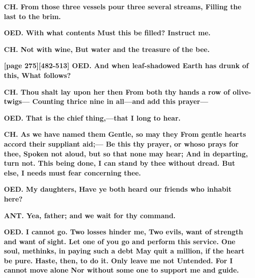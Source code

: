 \documentclass[11pt,letter]{book}
\begin{document}
\par \textbf{CH. From those three vessels pour three several streams, Filling the last to the brim.}
\par 

\par \textbf{OED. With what contents Must this be filled? Instruct me.}
\par 

\par \textbf{CH. Not with wine, But water and the treasure of the bee.}
\par 

\par \textbf{[page 275][482-513] OED. And when leaf-shadowed Earth has drunk of this, What follows?}
\par 

\par \textbf{CH. Thou shalt lay upon her then From both thy hands a row of olive-twigs— Counting thrice nine in all—and add this prayer—}
\par 

\par \textbf{OED. That is the chief thing,—that I long to hear.}
\par 

\par \textbf{CH. As we have named them Gentle, so may they From gentle hearts accord their suppliant aid;— Be this thy prayer, or whoso prays for thee, Spoken not aloud, but so that none may hear; And in departing, turn not. This being done, I can stand by thee without dread. But else, I needs must fear concerning thee.}
\par 

\par \textbf{OED. My daughters, Have ye both heard our friends who inhabit here?}
\par 

\par \textbf{ANT. Yea, father; and we wait for thy command.}
\par 

\par \textbf{OED. I cannot go. Two losses hinder me, Two evils, want of strength and want of sight. Let one of you go and perform this service. One soul, methinks, in paying such a debt May quit a million, if the heart be pure. Haste, then, to do it. Only leave me not Untended. For I cannot move alone Nor without some one to support me and guide.}
\par 
\end{document}
